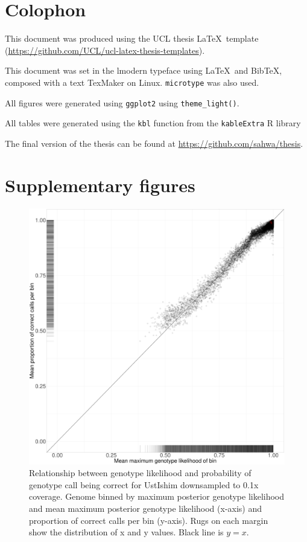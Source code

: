 \chapter{Colophon}
\label{appendixlabel3}

This document was produced using the UCL thesis \LaTeX\ template (\url{https://github.com/UCL/ucl-latex-thesis-templates}).

This document was set in the lmodern typeface using \LaTeX\ and Bib\TeX, composed with a text TexMaker on Linux. \texttt{microtype} was also used.

All figures were generated using \texttt{ggplot2} using \texttt{theme\_light()}.

All tables were generated using the \texttt{kbl} function from the \texttt{kableExtra} R library

The final version of the thesis can be found at \url{https://github.com/sahwa/thesis}.

\chapter{Supplementary figures}
\label{appendixlabel4}

\begin{figure}[htp]
    \centering
    \includegraphics[width=1.0\textwidth]{../images/appendix/UstIshim_0.1x_bin.pdf}
    \caption{Relationship between genotype likelihood and probability of genotype call being correct for UstIshim downsampled to 0.1x coverage. Genome binned by maximum posterior genotype likelihood and mean maximum posterior genotype likelihood (x-axis) and proportion of correct calls per bin (y-axis). Rugs on each margin show the distribution of x and y values. Black line is $y=x$.}
    \label{fig:UstIshim_0.1x_bin}
\end{figure}

